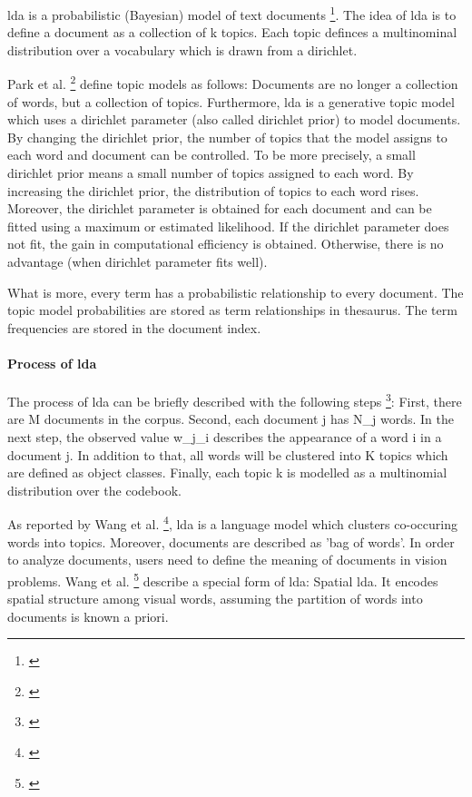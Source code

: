 \gls{lda} is a probabilistic (Bayesian) model of text documents \footnote{\autocite{hoffmann_2010}}. The idea of \gls{lda} is to define a document as a collection of k topics. Each topic definces a multinominal distribution over a vocabulary which is drawn from a dirichlet.

Park et al. \footnote{\autocite{park_2009}} define topic models as follows: Documents are no longer a collection of words, but a collection of topics. Furthermore, \gls{lda} is a generative topic model which uses a dirichlet parameter (also called dirichlet prior) to model documents. By changing the dirichlet prior, the number of topics that the model assigns to each word and document can be controlled. To be more precisely, a small dirichlet prior means a small number of topics assigned to each word. By increasing the dirichlet prior, the distribution of topics to each word rises. Moreover, the dirichlet parameter is obtained for each document and can be fitted using a maximum or estimated likelihood. If the dirichlet parameter does not fit, the gain in computational efficiency is obtained. Otherwise, there is no advantage (when dirichlet parameter fits well). 

What is more, every term has a probabilistic relationship to every document. The topic model probabilities are stored as term relationships in thesaurus. The term frequencies are stored in the document index.

\paragraph{Process of \gls{lda}}

The process of \gls{lda} can be briefly described with the following steps \footnote{\autocite{wang_2008}}: First, there are M documents in the corpus. Second, each document j has N_j words. In the next step, the observed value w_j_i describes the appearance of a word i in a document j. In addition to that, all words will be clustered into K topics which are defined as object classes. Finally, each topic k is modelled as a multinomial distribution over the codebook.

As reported by Wang et al. \footnote{\autocite{wang_2008}}, \gls{lda} is a language model which clusters co-occuring words into topics. Moreover, documents are described as 'bag of words'. In order to analyze documents, users need to define the meaning of documents in vision problems. 
Wang et al. \footnote{\autocite{wang_2008}} describe a special form of \gls{lda}: Spatial \gls{lda}. It encodes spatial structure among visual words, assuming the partition of words into documents is known a priori. 

